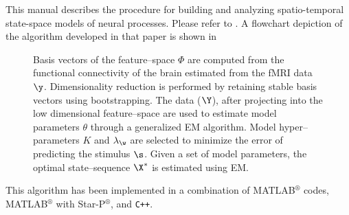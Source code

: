 \documentclass[12pt,twoside]{article}
\renewcommand{\cite}[1]{{\color{blue}\citep{#1}}}
\begin{document}
\tableofcontents

\cleartooddpage


%

This manual describes the procedure for building and analyzing
spatio-temporal state-space models of neural processes.  Please refer
to \cite{Janoos2011}.  A flowchart depiction of the algorithm
developed in that paper is shown in 

\begin{figure}[h!]
  \caption[Outline of Method]{
  Basis vectors of the feature--space $\Phi$ are computed from the functional
  connectivity of the brain estimated from
  the fMRI data $\y$.  Dimensionality reduction is performed
  by retaining stable basis vectors using bootstrapping.
  The data ($\Y$), after projecting into the low dimensional feature--space
 are used to estimate model   parameters $\theta$ through a
  generalized EM algorithm.
  Model hyper--parameters $K$ and $\lambda_\w$ are selected
  to minimize the error of predicting the stimulus $\s$.
  Given a set of model parameters, the optimal
  state--sequence $\X^*$ is estimated using EM.
  }\label{fig:pipeline}
\end{figure}

This algorithm has been implemented in a combination of
MATLAB$^\circledR$ codes, MATLAB$^\circledR$ with
Star-P$^\circledR$, and \verb"C++".
\end{document}
